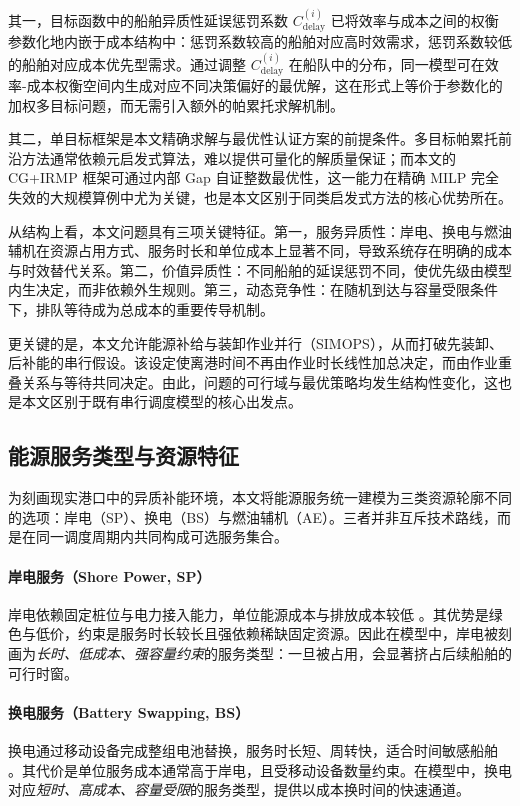 \documentclass[UTF8, a4paper, 12pt]{ctexart}
\theoremstyle{plain}
\theoremstyle{definition}
\theoremstyle{remark}
\begin{document}
其一，目标函数中的船舶异质性延误惩罚系数 $C^{(i)}_{\text{delay}}$ 已将效率与成本之间的权衡参数化地内嵌于成本结构中：惩罚系数较高的船舶对应高时效需求，惩罚系数较低的船舶对应成本优先型需求。通过调整 $C^{(i)}_{\text{delay}}$ 在船队中的分布，同一模型可在效率-成本权衡空间内生成对应不同决策偏好的最优解，这在形式上等价于参数化的加权多目标问题，而无需引入额外的帕累托求解机制。

其二，单目标框架是本文精确求解与最优性认证方案的前提条件。多目标帕累托前沿方法通常依赖元启发式算法，难以提供可量化的解质量保证；而本文的 CG+IRMP 框架可通过内部 Gap 自证整数最优性，这一能力在精确 MILP 完全失效的大规模算例中尤为关键，也是本文区别于同类启发式方法的核心优势所在。

从结构上看，本文问题具有三项关键特征。第一，服务异质性：岸电、换电与燃油辅机在资源占用方式、服务时长和单位成本上显著不同，导致系统存在明确的成本与时效替代关系。第二，价值异质性：不同船舶的延误惩罚不同，使优先级由模型内生决定，而非依赖外生规则。第三，动态竞争性：在随机到达与容量受限条件下，排队等待成为总成本的重要传导机制。

更关键的是，本文允许能源补给与装卸作业并行（SIMOPS），从而打破先装卸、后补能的串行假设。该设定使离港时间不再由作业时长线性加总决定，而由作业重叠关系与等待共同决定。由此，问题的可行域与最优策略均发生结构性变化，这也是本文区别于既有串行调度模型的核心出发点。

\subsection{能源服务类型与资源特征}
\label{sec:energy_service_types}

为刻画现实港口中的异质补能环境，本文将能源服务统一建模为三类资源轮廓不同的选项：岸电（SP）、换电（BS）与燃油辅机（AE）。三者并非互斥技术路线，而是在同一调度周期内共同构成可选服务集合。

\paragraph{岸电服务（Shore Power, SP）}
岸电依赖固定桩位与电力接入能力，单位能源成本与排放成本较低 \cite{andersson2017shipping,bergqvist2019ports}。其优势是绿色与低价，约束是服务时长较长且强依赖稀缺固定资源。因此在模型中，岸电被刻画为\emph{长时、低成本、强容量约束}的服务类型：一旦被占用，会显著挤占后续船舶的可行时窗。

\paragraph{换电服务（Battery Swapping, BS）}
换电通过移动设备完成整组电池替换，服务时长短、周转快，适合时间敏感船舶 \cite{Zhang2022_EShip,Bei2024}。其代价是单位服务成本通常高于岸电，且受移动设备数量约束。在模型中，换电对应\emph{短时、高成本、容量受限}的服务类型，提供以成本换时间的快速通道。
\end{document}
